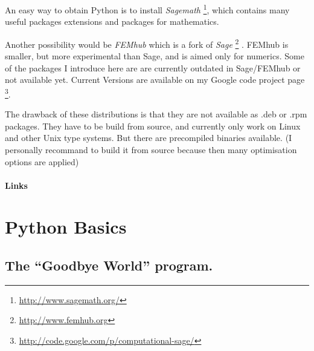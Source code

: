 \documentclass[letterpaper,10pt,english]{manual}
\begin{document}
An easy way to obtain Python is to install \emph{Sagemath} \footnote{
\href{http://www.sagemath.org/}{http://www.sagemath.org/}
}, which contains many useful packages extensions
and packages for mathematics.

Another possibility would be \emph{FEMhub} which is a fork of \emph{Sage} \footnote{
\href{http://www.femhub.org}{http://www.femhub.org}
} . FEMhub is smaller, but more experimental than
Sage, and is aimed only for numerics.
Some of the packages I introduce here are are currently outdated in Sage/FEMhub or not available yet. Current Versions are
available on my Google code project page \footnote{
\href{http://code.google.com/p/computational-sage/}{http://code.google.com/p/computational-sage/}
}.

The drawback of these distributions is that they are not available as .deb or .rpm packages. They have to be build
from source, and currently only work on Linux and other Unix type systems.
But there are precompiled binaries available. (I personally recommand to
build it from source because then many optimisation options are applied)
\paragraph{Links}

\resetcurrentobjects
\hypertarget{--doc-Steps}{}

\hypertarget{basics-ref}{}\section{Python Basics}


\subsection{The ``Goodbye World'' program.}
\end{document}
